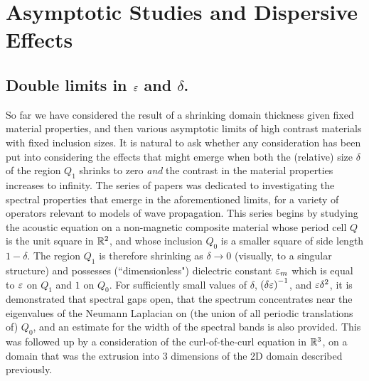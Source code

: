 \section{Asymptotic Studies and Dispersive Effects} 





\subsection{Double limits in $\varepsilon$ and $\delta$.} \label{ssec:Intro-DoubleLimits}
So far we have considered the result of a shrinking domain thickness given fixed material properties, and then various asymptotic limits of high contrast materials with fixed inclusion sizes. 
It is natural to ask whether any consideration has been put into considering the effects that might emerge when both the (relative) size $\delta$ of the region $Q_1$ shrinks to zero \emph{and} the contrast in the material properties increases to infinity.
The series of papers \cite{figotin1996band-scalar, figotin1996band-maxwell, figotin1998spectral} was dedicated to investigating the spectral properties that emerge in the aforementioned limits, for a variety of operators relevant to models of wave propagation.
This series begins \cite{figotin1996band-scalar} by studying the acoustic equation on a non-magnetic composite material whose period cell $Q$ is the unit square in $\mathbb{R}^2$, and whose inclusion $Q_0$ is a smaller square of side length $1-\delta$.
The region $Q_1$ is therefore shrinking as $\delta\rightarrow0$ (visually, to a singular structure) and possesses (``dimensionless") dielectric constant $\varepsilon_m$ which is equal to $\varepsilon$ on $Q_1$ and $1$ on $Q_0$.
For sufficiently small values of $\delta$, $\left( \delta\varepsilon \right)^{-1}$, and $\varepsilon\delta^2$, it is demonstrated that spectral gaps open, that the spectrum concentrates near the eigenvalues of the Neumann Laplacian on (the union of all periodic translations of) $Q_0$, and an estimate for the width of the spectral bands is also provided.
This was followed up \cite{figotin1996band-maxwell} by a consideration of the curl-of-the-curl equation in $\mathbb{R}^3$, on a domain that was the extrusion into 3 dimensions of the 2D domain described previously.
